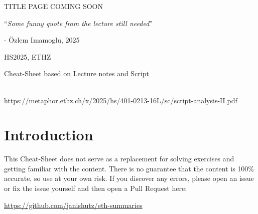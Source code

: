 \documentclass{article}
\begin{document}
\maketitle
\usetcolorboxes
\setcounter{numberingConfig}{3}
\setcounter{numberSubsections}{1}


\vspace{2cm}
\begin{Huge}
    \begin{center}
        TITLE PAGE COMING SOON
    \end{center}
\end{Huge}


\vspace{4cm}
\begin{center}
    \begin{Large}
        ``\textit{Some funny quote from the lecture still needed}''
    \end{Large}

    \hspace{3cm} - Özlem Imamoglu, 2025
\end{center}

\vspace{3cm}
\begin{center}
    HS2025, ETHZ\\[0.2cm]
    \begin{Large}
        Cheat-Sheet based on Lecture notes and Script
    \end{Large}\\[0.2cm]

    \url{https://metaphor.ethz.ch/x/2025/hs/401-0213-16L/sc/script-analysis-II.pdf} 
\end{center}


\newpage
{}


\newpage
\section{Introduction}
This Cheat-Sheet does not serve as a replacement for solving exercises and getting familiar with the content.
There is no guarantee that the content is 100\% accurate, so use at your own risk. 
If you discover any errors, please open an issue or fix the issue yourself and then open a Pull Request here:

\url{https://github.com/janishutz/eth-summaries}
\end{document}
